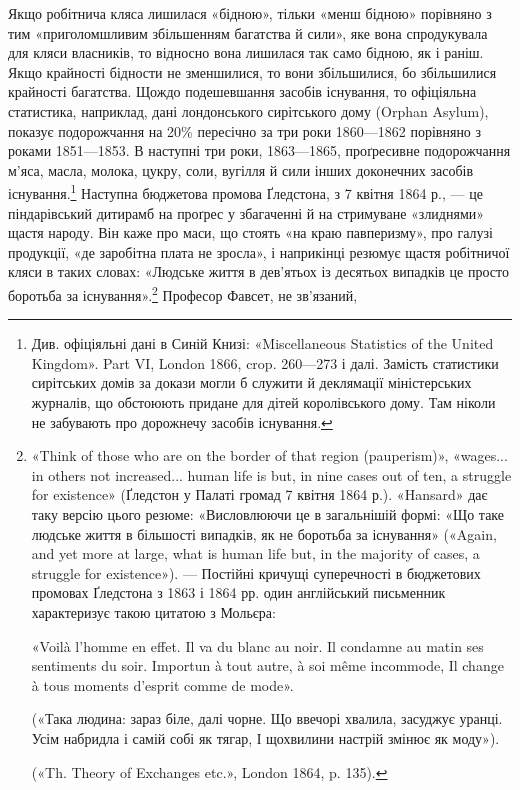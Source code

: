 Якщо робітнича кляса лишилася «бідною», тільки «менш
бідною» порівняно з тим «приголомшливим збільшенням багатства
й сили», яке вона спродукувала для кляси власників, то
відносно вона лишилася так само бідною, як і раніш. Якщо
крайності бідности не зменшилися, то вони збільшилися, бо
збільшилися крайності багатства. Щождо подешевшання засобів
існування, то офіціяльна статистика, наприклад, дані лондонського
сирітського дому (Orphan Asylum), показує подорожчання
на 20\% пересічно за три роки 1860—1862 порівняно з роками
1851—1853. В наступні три роки, 1863—1865, проґресивне
подорожчання м’яса, масла, молока, цукру, соли, вугілля й
сили інших доконечних засобів існування.\footnote{
Див. офіціяльні дані в Синій Книзі: «Miscellaneous Statistics
of the United Kingdom». Part VI, London 1866, crop. 260—273 і далі.
Замість статистики сирітських домів за докази могли б служити й деклямації
міністерських журналів, що обстоюють придане для дітей королівського
дому. Там ніколи не забувають про дорожнечу засобів існування.
} Наступна бюджетова
промова Ґледстона, з 7 квітня 1864 р., — це піндарівський
дитирамб на проґрес у збагаченні й на стримуване «злиднями»
щастя народу. Він каже про маси, що стоять «на краю
павперизму», про галузі продукції, «де заробітна плата не
зросла», і наприкінці резюмує щастя робітничої кляси в таких
словах: «Людське життя в дев’ятьох із десятьох випадків це
просто боротьба за існування».\footnote{
«Think of those who are on the border of that region (pauperism)»,
«wages... in others not increased... human life is but, in nine cases out of ten,
a struggle for existence» (Ґледстон у Палаті громад 7 квітня 1864 р.).
«Hansard» дає таку версію цього резюме: «Висловлюючи це в загальнішій
формі: «Що таке людське життя в більшості випадків, як не боротьба
за існування» («Again, and yet more at large, what is human life but,
in the majority of cases, a struggle for existence»). — Постійні кричущі суперечності
в бюджетових промовах Ґледстона з 1863 і 1864 рр. один англійський
письменник характеризує такою цитатою з Мольєра:

«Voilà l’homme en effet. Il va du blanc au noir.
Il condamne au matin ses sentiments du soir.
Importun à tout autre, à soi même incommode,
Il change à tous moments d’esprit comme de mode».

(«Така людина: зараз біле, далі чорне.
Що ввечорі хвалила, засуджує уранці.
Усім набридла і самій собі як тягар,
І щохвилини настрій змінює як моду»).

(«Th. Theory of Exchanges etc.»,
London 1864, p. 135).
} Професор Фавсет, не зв’язаний,
